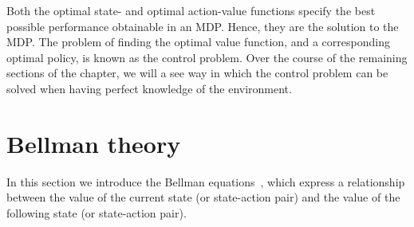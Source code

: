 Both the optimal state- and optimal action-value functions specify the best possible performance obtainable in an MDP. Hence, they are the solution to the MDP. The problem of finding the optimal value function, and a corresponding optimal policy, is known as the control problem. Over the course of the remaining sections of the chapter, we will a see way in which the control problem can be solved when having perfect knowledge of the environment.

\section{Bellman theory}
In this section we introduce the Bellman equations~\cite{bellman1957dynamic}, which express a relationship between the value of the current state (or state-action pair) and the value of the following state (or state-action pair).

